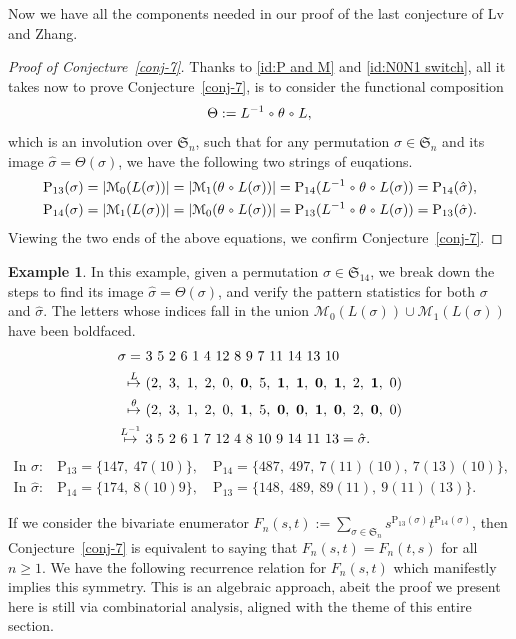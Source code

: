 \documentclass[12pt,reqno]{article}
\numberwithin{equation}{section}
\theoremstyle{plain}
\theoremstyle{definition}
\newtheorem{example}[theorem]{Example}
\newcommand{\circo}{~\raisebox{1pt}{\tikz \draw[line width=0.5pt] circle(1.2pt);}~}
\def\fS{\mathfrak{S}}
\def\rP{\mathrm{P}}
\def\cN{\mathcal{M}}
\begin{document}
Now we have all the components needed in our proof of the last conjecture of Lv and Zhang.

\begin{proof}[Proof of Conjecture~\ref{conj-7}]
Thanks to \eqref{id:P and M} and \eqref{id:N0N1 switch}, all it takes now to prove Conjecture~\ref{conj-7}, is to consider the functional composition
$$\Theta:=L^{-1}\circo\theta\circo L,$$
which is an involution over $\fS_n$, such that for any permutation $\sigma\in\fS_n$ and its image $\hat{\sigma}=\Theta(\sigma)$, we have the following two strings of euqations. 
\begin{align*}
\rP_{13}(\sigma)=|\cN_0(L(\sigma))|=|\cN_1(\theta\circo L(\sigma))|=\rP_{14}(L^{-1}\circo\theta\circo L(\sigma))=\rP_{14}(\hat{\sigma}),\\
\rP_{14}(\sigma)=|\cN_1(L(\sigma))|=|\cN_0(\theta\circo L(\sigma))|=\rP_{13}(L^{-1}\circo\theta\circo L(\sigma))=\rP_{13}(\hat{\sigma}).
\end{align*}
Viewing the two ends of the above equations, we confirm Conjecture~\ref{conj-7}.
\end{proof}

\begin{example}\label{p13p14exa}
In this example, given a permutation $\sigma\in\fS_{14}$, we break down the steps to find its image $\hat{\sigma}=\Theta(\sigma)$, and verify the pattern statistics for both $\sigma$ and $\hat{\sigma}$. The letters whose indices fall in the union $\cN_0(L(\sigma))\cup \cN_1(L(\sigma))$ have been boldfaced.
	\begin{align*}
		\sigma = &~3~5~ 2~ 6 ~1~ 4 ~12~ 8~ 9 ~7~ 11~ 14~ 13 ~10\\
		\stackrel{L}{\mapsto} &~(2,~3,~1,~2,~0,~{\bf0},~5,~{\bf1},~{\bf1},~{\bf0},~{\bf1},~2,~{\bf1},~0)\\
		\stackrel{\theta}{\mapsto} &~(2,~3,~1,~2,~0,~{\bf1},~5,~{\bf0},~{\bf0},~{\bf1},~{\bf0},~2,~{\bf0},~0)\\
		\stackrel{L^{-1}}{\mapsto} &~3 ~5 ~2~ 6 ~1~ 7~ 12~ 4~ 8~ 10~ 9~ 14~ 11~ 13=\hat{\sigma}.
	\end{align*}
\begin{align*}
\text{In $\sigma$:}&~\rP_{13}=\{147,~47(10)\},	\quad \rP_{14}=\{487,~497,~7(11)(10),~7(13)(10)\},\\
\text{In $\hat{\sigma}$:}&~\rP_{14}=\{174,~8(10)9\},	\quad \rP_{13}=\{148,~489,~89(11),~9(11)(13)\}.
\end{align*}
\end{example}

If we consider the bivariate enumerator $F_n(s,t):= \sum_{\sigma \in \fS_{n}} s^{\rP_{13}(\sigma)}t^{\rP_{14}(\sigma)}$, then Conjecture~\ref{conj-7} is equivalent to saying that $F_n(s,t)=F_n(t,s)$ for all $n\ge 1$. We have the following recurrence relation for $F_n(s,t)$ which manifestly implies this symmetry. This is an algebraic approach, abeit the proof we present here is still via combinatorial analysis, aligned with the theme of this entire section.
\end{document}
